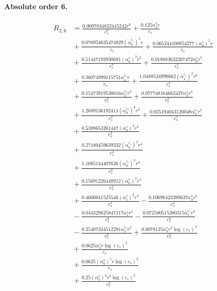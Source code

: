 \documentclass[10pt]{article}
\begin{document}
\paragraph{Absolute order 6.}
\begin{align*}
R_{2,6} &= \frac{0.0007834832445242 r^{6}}{c_{s}^{6}} + \frac{0.125 \alpha_{4}^s r}{c_{s}} \\
&{}  + \frac{0.076954635474829 \left(\alpha_{0}^{c_s}\right)^{5} r}{c_{s}} + \frac{0.065244100954277 \left(\alpha_{0}^s\right)^{5} r}{c_{s}} \\
&{}  + \frac{0.51447193930681 \left(\alpha_{0}^s\right)^{3} r^{3}}{c_{s}^{3}} + \frac{0.018883632267472 \alpha_{0}^s r^{5}}{c_{s}^{5}} \\
&{}  + \frac{0.36074999115751 \alpha_{4}^{c_s} r}{c_{s}} + \frac{1.0488534998662 \left(\alpha_{1}^{c_s}\right)^{2} r^{2}}{c_{s}^{2}} \\
&{}  + \frac{0.15473919538016 \alpha_{2}^{c_s} r^{3}}{c_{s}^{3}} + \frac{0.077748164662437 \alpha_{2}^s r^{3}}{c_{s}^{3}} \\
&{}  + \frac{1.2689136192411 \left(\alpha_{0}^{c_s}\right)^{4} r^{2}}{c_{s}^{2}} + \frac{0.025194043126048 \alpha_{0}^{c_s} r^{5}}{c_{s}^{5}} \\
&{}  + \frac{0.5388653261447 \left(\alpha_{0}^s\right)^{4} r^{2}}{c_{s}^{2}} \\
&{}  + \frac{0.27180459639332 \left(\alpha_{0}^{c_s}\right)^{2} r^{4}}{c_{s}^{4}} \\
&{}  + \frac{1.1085144407626 \left(\alpha_{0}^{c_s}\right)^{3} r^{3}}{c_{s}^{3}} \\
&{}  + \frac{0.15691226448912 \left(\alpha_{0}^s\right)^{2} r^{4}}{c_{s}^{4}} \\
&{}  + \frac{0.4600841525546 \left(\alpha_{1}^s\right)^{2} r^{2}}{c_{s}^{2}} - \frac{0.10698423390637 \alpha_{3}^s r^{2}}{c_{s}^{2}} \\
&{}  - \frac{0.044329625847117 \alpha_{1}^s r^{4}}{c_{s}^{4}} - \frac{0.072500515380315 \alpha_{1}^{c_s} r^{4}}{c_{s}^{4}} \\
&{}  - \frac{0.25407334512281 \alpha_{3}^{c_s} r^{2}}{c_{s}^{2}} + \frac{0.0078125 \alpha_{3}^s r^{2} \log{\left(c_{s} \right)}^{3}}{c_{s}^{2}} \\
&{}  + \frac{0.0625 \alpha_{4}^s r \log{\left(c_{s} \right)}^{2}}{c_{s}} \\
&{}  + \frac{0.0625 \left(\alpha_{0}^s\right)^{5} r \log{\left(c_{s} \right)}^{2}}{c_{s}} \\
&{}  + \frac{0.25 \left(\alpha_{0}^s\right)^{4} r^{2} \log{\left(c_{s} \right)}^{2}}{c_{s}^{2}} \\

\end{align*}
\end{document}
